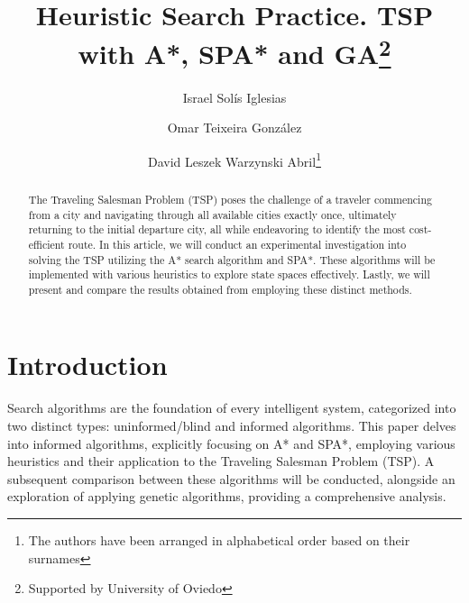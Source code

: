 \documentclass[runningheads]{llncs}
\begin{document}
%
\title{Heuristic Search Practice. TSP with A*, SPA* and GA\thanks{Supported by University of Oviedo}}
%
%
\author{Israel Solís Iglesias \and
Omar Teixeira González \and
David Leszek Warzynski Abril\thanks{The authors have been arranged in alphabetical order based on their surnames}}
%
%
%
\maketitle              %
%

\begin{abstract}
The Traveling Salesman Problem (TSP) poses the challenge of a traveler commencing from a city and navigating through all available cities exactly once, ultimately returning to the initial departure city, all while endeavoring to identify the most cost-efficient route. In this article, we will conduct an experimental investigation into solving the TSP utilizing the A* search algorithm and SPA*. These algorithms will be implemented with various heuristics to explore state spaces effectively. Lastly, we will present and compare the results obtained from employing these distinct methods.
\end{abstract}

% 
% 
\section{Introduction}
Search algorithms are the foundation of every intelligent system, categorized into two distinct types: uninformed/blind and informed algorithms. This paper delves into informed algorithms, explicitly focusing on A* and SPA*, employing various heuristics and their application to the Traveling Salesman Problem (TSP). A subsequent comparison between these algorithms will be conducted, alongside an exploration of applying genetic algorithms, providing a comprehensive analysis. 
\end{document}
